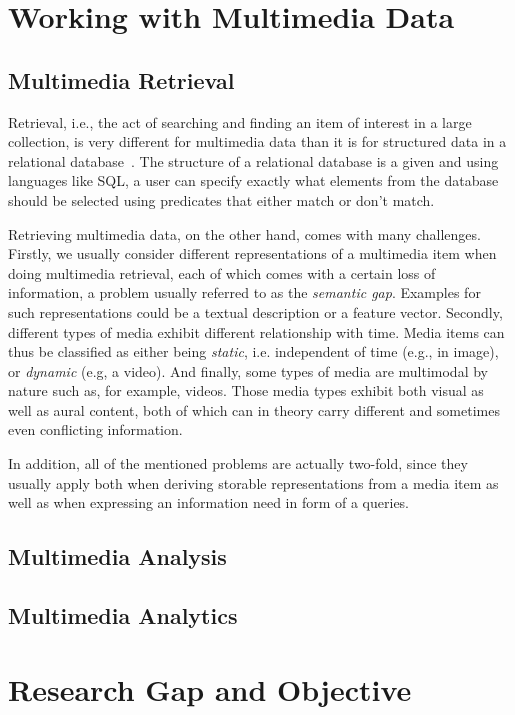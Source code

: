 \section{Working with Multimedia Data}

\subsection{Multimedia Retrieval}

Retrieval, i.e., the act of searching and finding an item of interest in a large collection, is very different for multimedia data than it is for structured data in a relational database~\cite{Blanken:2007multimedia}. The structure of a relational database is a given and using languages like SQL, a user can specify exactly what elements from the database should be selected using predicates that either match or don't match.

Retrieving multimedia data, on the other hand, comes with many challenges. Firstly, we usually consider different representations of a multimedia item when doing multimedia retrieval, each of which comes with a certain loss of information, a problem usually referred to as the \emph{semantic gap}. Examples for such representations could be a textual description or a feature vector. Secondly, different types of media exhibit different relationship with time. Media items can thus be classified as either being \emph{static}, i.e. independent of time (e.g., in image), or \emph{dynamic} (e.g, a video). And finally, some types of media are multimodal by nature such as, for example, videos. Those media types exhibit both visual as well as aural content, both of which can in theory carry different and sometimes even conflicting information.

In addition, all of the mentioned problems are actually two-fold, since they usually apply  both when deriving storable representations from a media item as well as when expressing an information need in form of a queries.

\subsection{Multimedia Analysis}

\subsection{Multimedia Analytics}


\section{Research Gap and Objective}

